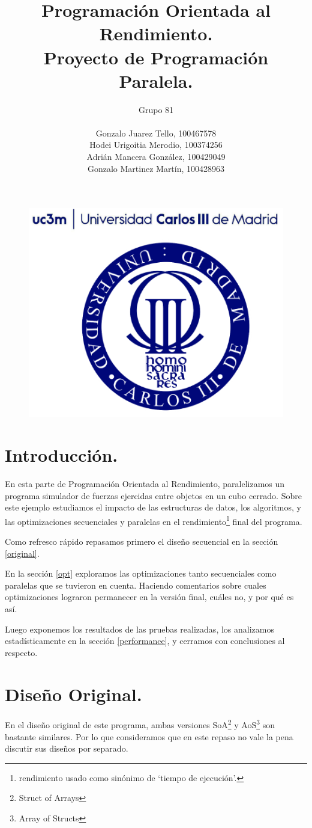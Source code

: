 \documentclass{article}
\title{Programación Orientada al Rendimiento.\\Proyecto de Programación Paralela.}
\author{Grupo 81\\ \\
	Gonzalo Juarez Tello, 100467578\\
	Hodei Urigoitia Merodio, 100374256\\
	Adrián Mancera González, 100429049\\
	Gonzalo Martinez Martín, 100428963
}
\date{}
\begin{document}
\begin{figure}
	\includegraphics[width=\linewidth,height=0.7\textwidth]{resources/logo_uc3m.png}
\end{figure}
\maketitle
\newpage

\tableofcontents
\newpage

\section{Introducción.\label{intro}}
En esta parte de Programación Orientada al Rendimiento, paralelizamos
un programa simulador de fuerzas ejercidas entre objetos
en un cubo cerrado. Sobre este ejemplo estudiamos el impacto de las
estructuras de datos, los algoritmos, y las optimizaciones secuenciales
y paralelas en el rendimiento\footnote{rendimiento usado como sinónimo de
`tiempo de ejecución'.} final del programa.

Como refresco rápido repasamos primero el diseño secuencial en la sección \ref{original}.


En la sección \ref{opt} exploramos las optimizaciones tanto secuenciales como
paralelas que se tuvieron en cuenta. Haciendo comentarios
sobre cuales optimizaciones lograron permanecer en la versión final, cuáles no, y por qué es así.


Luego exponemos los resultados de las pruebas realizadas, los analizamos estadísticamente en la sección \ref{performance},
y cerramos con conclusiones al respecto.

\section{Diseño Original.\label{original}}
En el diseño original de este programa, ambas versiones SoA\footnote{Struct of Arrays} y AoS\footnote{Array of Structs}
son bastante similares. Por lo que consideramos que en este repaso no vale la pena discutir sus diseños por separado.
\end{document}

